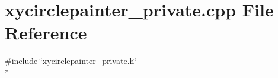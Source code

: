 \section{xycirclepainter\+\_\+private.\+cpp File Reference}
\label{bk3_2circles_2xycirclepainter__private_8cpp}
{\ttfamily \#include \char`\"{}xycirclepainter\+\_\+private.\+h\char`\"{}}\\*
